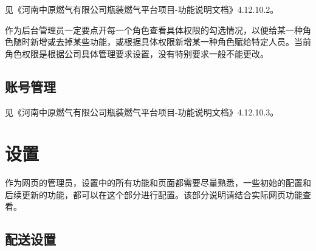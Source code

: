 \documentclass[UTF8]{ctexart}
\begin{document}
见《河南中原燃气有限公司瓶装燃气平台项目-功能说明文档》4.12.10.2。

作为后台管理员一定要点开每一个角色查看具体权限的勾选情况，以便给某一种角色随时新增或去掉某些功能，或根据具体权限新增某一种角色赋给特定人员。当前角色权限是根据公司具体管理要求设置，没有特别要求一般不能更改。

\subsection{账号管理}

见《河南中原燃气有限公司瓶装燃气平台项目-功能说明文档》4.12.10.3。



\section{设置}
作为网页的管理员，设置中的所有功能和页面都需要尽量熟悉，一些初始的配置和后续更新的功能，都可以在这个部分进行配置。该部分说明请结合实际网页功能查看。

\subsection{配送设置}
\end{document}
